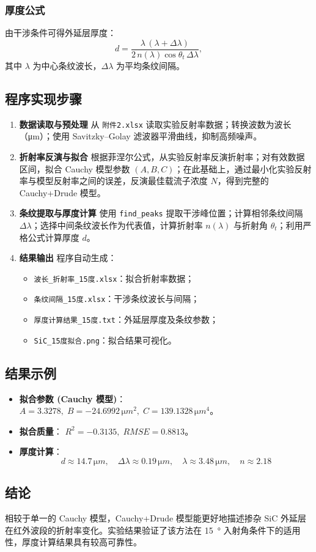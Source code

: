 \subsubsection{厚度公式}
由干涉条件可得外延层厚度：
\begin{equation}
d = \frac{\lambda \, (\lambda + \Delta \lambda)}{2 \, n(\lambda) \cos\theta_t \, \Delta \lambda},
\end{equation}
其中 $\lambda$ 为中心条纹波长，$\Delta \lambda$ 为平均条纹间隔。

\subsection{程序实现步骤}

\begin{enumerate}
    \item \textbf{数据读取与预处理}  
    从 \texttt{附件2.xlsx} 读取实验反射率数据；转换波数为波长（\si{\micro\meter}）；使用 Savitzky–Golay 滤波器平滑曲线，抑制高频噪声。

    \item \textbf{折射率反演与拟合}  
    根据菲涅尔公式，从实验反射率反演折射率；对有效数据区间，拟合 Cauchy 模型参数 $(A, B, C)$；在此基础上，通过最小化实验反射率与模型反射率之间的误差，反演最佳载流子浓度 $N$，得到完整的 Cauchy+Drude 模型。

    \item \textbf{条纹提取与厚度计算}  
    使用 \texttt{find\_peaks} 提取干涉峰位置；计算相邻条纹间隔 $\Delta \lambda$；选择中间条纹波长作为代表值，计算折射率 $n(\lambda)$ 与折射角 $\theta_t$；利用严格公式计算厚度 $d$。

    \item \textbf{结果输出}  
    程序自动生成：
    \begin{itemize}
        \item \texttt{波长\_折射率\_15度.xlsx}：拟合折射率数据；
        \item \texttt{条纹间隔\_15度.xlsx}：干涉条纹波长与间隔；
        \item \texttt{厚度计算结果\_15度.txt}：外延层厚度及条纹参数；
        \item \texttt{SiC\_15度拟合.png}：拟合结果可视化。
    \end{itemize}
\end{enumerate}

\subsection{结果示例}
\begin{itemize}
    \item \textbf{拟合参数 (Cauchy 模型)}：  
    $A = 3.3278,\; B = -24.6992 \,\si{\micro m^2},\; C = 139.1328 \,\si{\micro m^4}$。
    \item \textbf{拟合质量}：  
    $R^2 = -0.3135,\; RMSE = 0.8813$。
    \item \textbf{厚度计算}：  
    \[
    d \approx 14.7 \,\si{\micro m}, \quad
    \Delta \lambda \approx 0.19 \,\si{\micro m}, \quad
    \lambda \approx 3.48 \,\si{\micro m}, \quad
    n \approx 2.18
    \]
\end{itemize}

\subsection{结论}
相较于单一的 Cauchy 模型，Cauchy+Drude 模型能更好地描述掺杂 SiC 外延层在红外波段的折射率变化。实验结果验证了该方法在 \SI{15}{\degree} 入射角条件下的适用性，厚度计算结果具有较高可靠性。
